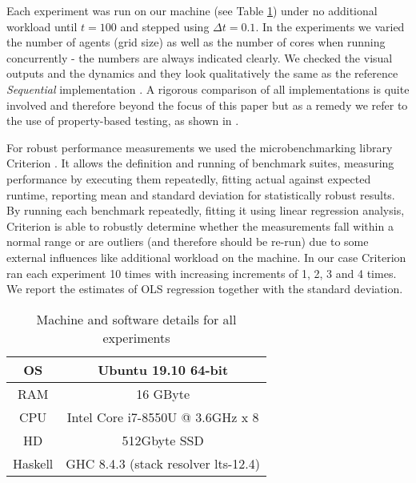 Each experiment was run on our machine (see Table \ref{tab:machine_specs}) under no additional workload until $t = 100$ and stepped using $\Delta t = 0.1$. In the experiments we varied the number of agents (grid size) as well as the number of cores when running concurrently - the numbers are always indicated clearly. We checked the visual outputs and the dynamics and they look qualitatively the same as the reference \textit{Sequential} implementation \cite{thaler_pure_2018}. A rigorous comparison of all implementations is quite involved and therefore beyond the focus of this paper but as a remedy we refer to the use of property-based testing, as shown in \cite{thaler_show_2019}.

For robust performance measurements we used the microbenchmarking library Criterion \cite{criterion_serpentine, criterion_hackage}. It allows the definition and running of benchmark suites, measuring performance by executing them repeatedly, fitting actual against expected runtime, reporting mean and standard deviation for statistically robust results. By running each benchmark repeatedly, fitting it using linear regression analysis, Criterion is able to robustly determine whether the measurements fall within a normal range or are outliers (and therefore should be re-run) due to some external influences like additional workload on the machine. In our case Criterion ran each experiment 10 times with increasing increments of 1, 2, 3 and 4 times. We report the estimates of OLS regression together with the standard deviation.


\begin{table}
	\centering
	\begin{tabular}{ c || c }
		OS & Ubuntu 19.10 64-bit \\ \hline
		RAM & 16 GByte \\ \hline
		CPU & Intel Core i7-8550U @ 3.6GHz x 8 \\ \hline
		HD & 512Gbyte SSD \\ \hline
		Haskell & GHC 8.4.3 (stack resolver lts-12.4)
	\end{tabular}
	
	\caption{Machine and software details for all experiments}
	\label{tab:machine_specs}
\end{table}

